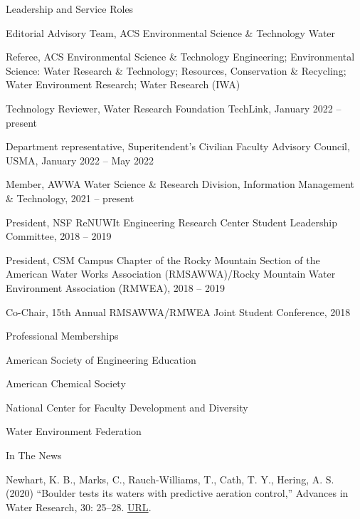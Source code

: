 \documentclass{resume} %
\begin{document}
\begin{rSection}{Leadership and Service Roles}

Editorial Advisory Team, ACS Environmental Science \& Technology Water

Referee, ACS Environmental Science \& Technology Engineering; Environmental Science: Water Research \& Technology; Resources, Conservation \& Recycling; Water Environment Research; Water Research (IWA)

Technology Reviewer, Water Research Foundation TechLink, January 2022 – present

Department representative, Superitendent's Civilian Faculty Advisory Council, USMA, January 2022 – May 2022

Member, AWWA Water Science \& Research Division, Information Management \& Technology, 2021 – present

President, NSF ReNUWIt Engineering Research Center Student Leadership Committee, 2018 – 2019

President, CSM Campus Chapter of the Rocky Mountain Section of the American Water Works Association (RMSAWWA)/Rocky Mountain Water Environment Association (RMWEA), 2018 – 2019

Co-Chair, 15th Annual RMSAWWA/RMWEA Joint Student Conference, 2018

\end{rSection}

\begin{rSection}{Professional Memberships}

American Society of Engineering Education

American Chemical Society

National Center for Faculty Development and Diversity

Water Environment Federation

\end{rSection}

\begin{rSection}{In The News}

Newhart, K. B., Marks, C., Rauch-Williams, T., Cath, T. Y., Hering, A. S. (2020) “Boulder tests its waters with predictive aeration control,” Advances in Water Research, 30: 25–28. \href{https://www.advancesinwaterresearch.org/awr/20200709/MobilePagedArticle.action?articleId=1621836&pm=1#articleId1621836}{URL}.
\end{rSection}
\newpage
\end{document}

